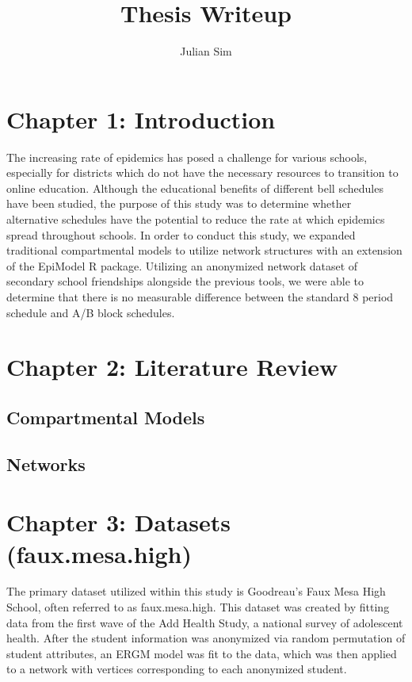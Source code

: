 \documentclass[
]{article}
\title{Thesis Writeup}
\author{Julian Sim}
\date{}
\begin{document}
\maketitle

\hypertarget{chapter-1-introduction}{%
\section{Chapter 1: Introduction}\label{chapter-1-introduction}}

The increasing rate of epidemics has posed a challenge for various
schools, especially for districts which do not have the necessary
resources to transition to online education. Although the educational
benefits of different bell schedules have been studied, the purpose of
this study was to determine whether alternative schedules have the
potential to reduce the rate at which epidemics spread throughout
schools. In order to conduct this study, we expanded traditional
compartmental models to utilize network structures with an extension of
the EpiModel R package. Utilizing an anonymized network dataset of
secondary school friendships alongside the previous tools, we were able
to determine that there is no measurable difference between the standard
8 period schedule and A/B block schedules.

\hypertarget{chapter-2-literature-review}{%
\section{Chapter 2: Literature
Review}\label{chapter-2-literature-review}}

\hypertarget{compartmental-models}{%
\subsection{Compartmental Models}\label{compartmental-models}}

\hypertarget{networks}{%
\subsection{Networks}\label{networks}}

\hypertarget{chapter-3-datasets-faux.mesa.high}{%
\section{Chapter 3: Datasets
(faux.mesa.high)}\label{chapter-3-datasets-faux.mesa.high}}

The primary dataset utilized within this study is Goodreau's Faux Mesa
High School, often referred to as faux.mesa.high. This dataset was
created by fitting data from the first wave of the Add Health Study, a
national survey of adolescent health. After the student information was
anonymized via random permutation of student attributes, an ERGM model
was fit to the data, which was then applied to a network with vertices
corresponding to each anonymized student.
\end{document}
